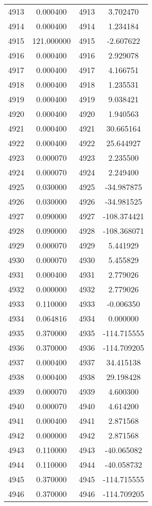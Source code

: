 \documentclass[12pt]{article}
\begin{document}
\begin{longtable}{@{}cccc@{}}
4913 & 0.000400 & 4913 & 3.702470 \\
4914 & 0.000400 & 4914 & 1.234184 \\
4915 & 121.000000 & 4915 & -2.607622 \\
4916 & 0.000400 & 4916 & 2.929078 \\
4917 & 0.000400 & 4917 & 4.166751 \\
4918 & 0.000400 & 4918 & 1.235531 \\
4919 & 0.000400 & 4919 & 9.038421 \\
4920 & 0.000400 & 4920 & 1.940563 \\
4921 & 0.000400 & 4921 & 30.665164 \\
4922 & 0.000400 & 4922 & 25.644927 \\
4923 & 0.000070 & 4923 & 2.235500 \\
4924 & 0.000070 & 4924 & 2.249400 \\
4925 & 0.030000 & 4925 & -34.987875 \\
4926 & 0.030000 & 4926 & -34.981525 \\
4927 & 0.090000 & 4927 & -108.374421 \\
4928 & 0.090000 & 4928 & -108.368071 \\
4929 & 0.000070 & 4929 & 5.441929 \\
4930 & 0.000070 & 4930 & 5.455829 \\
4931 & 0.000400 & 4931 & 2.779026 \\
4932 & 0.000000 & 4932 & 2.779026 \\
4933 & 0.110000 & 4933 & -0.006350 \\
4934 & 0.064816 & 4934 & 0.000000 \\
4935 & 0.370000 & 4935 & -114.715555 \\
4936 & 0.370000 & 4936 & -114.709205 \\
4937 & 0.000400 & 4937 & 34.415138 \\
4938 & 0.000400 & 4938 & 29.198428 \\
4939 & 0.000070 & 4939 & 4.600300 \\
4940 & 0.000070 & 4940 & 4.614200 \\
4941 & 0.000400 & 4941 & 2.871568 \\
4942 & 0.000000 & 4942 & 2.871568 \\
4943 & 0.110000 & 4943 & -40.065082 \\
4944 & 0.110000 & 4944 & -40.058732 \\
4945 & 0.370000 & 4945 & -114.715555 \\
4946 & 0.370000 & 4946 & -114.709205 \\

\end{longtable}
\end{document}
